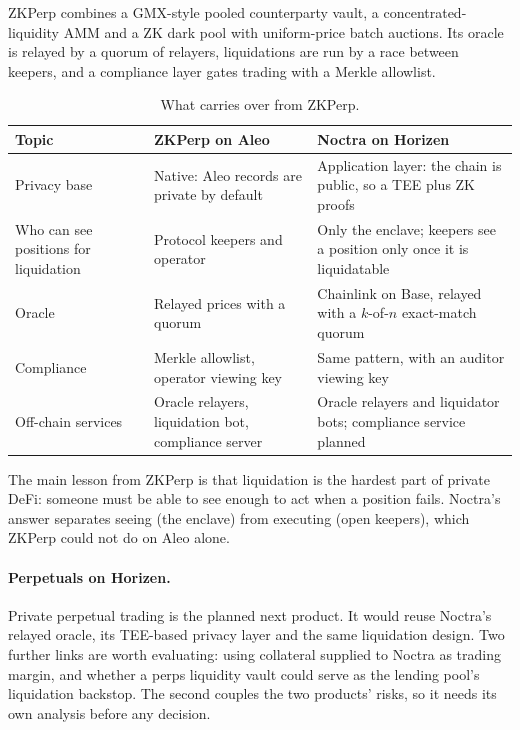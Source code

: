 \documentclass[11pt,a4paper]{article}
\begin{document}
ZKPerp combines a GMX-style pooled counterparty vault, a concentrated-liquidity AMM and a ZK dark pool with
uniform-price batch auctions. Its oracle is relayed by a quorum of relayers, liquidations are run by a race
between keepers, and a compliance layer gates trading with a Merkle allowlist.

\begin{table}[h]
\centering
\caption{What carries over from ZKPerp.}
\begin{tabularx}{\textwidth}{@{}p{3.2cm}LL@{}}
\toprule
Topic & ZKPerp on Aleo & Noctra on Horizen \\
\midrule
Privacy base & Native: Aleo records are private by default & Application layer: the chain is public, so a TEE
  plus ZK proofs \\
Who can see positions for liquidation & Protocol keepers and operator & Only the enclave; keepers see a
  position only once it is liquidatable \\
Oracle & Relayed prices with a quorum & Chainlink on Base, relayed with a $k$-of-$n$ exact-match quorum \\
Compliance & Merkle allowlist, operator viewing key & Same pattern, with an auditor viewing key \\
Off-chain services & Oracle relayers, liquidation bot, compliance server & Oracle relayers and liquidator bots;
  compliance service planned \\
\bottomrule
\end{tabularx}
\end{table}

The main lesson from ZKPerp is that liquidation is the hardest part of private DeFi: someone must be able to see
enough to act when a position fails. Noctra's answer separates seeing (the enclave) from executing (open
keepers), which ZKPerp could not do on Aleo alone.

\paragraph{Perpetuals on Horizen.} Private perpetual trading is the planned next product. It would reuse Noctra's relayed oracle, its TEE-based
privacy layer and the same liquidation design. Two further links are worth evaluating: using collateral
supplied to Noctra as trading margin, and whether a perps liquidity vault could serve as the lending pool's
liquidation backstop. The second couples the two products' risks, so it needs its own analysis before any
decision.
\end{document}
